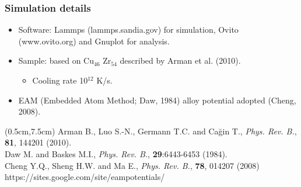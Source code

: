 \documentclass[12pt,t]{beamer}
\begin{document}

\begin{frame}
    \frametitle{Simulation details}
    \vspace{0.2cm}
    \begin{itemize}
        \item Software: Lammps (lammps.sandia.gov) for simulation, Ovito (www.ovito.org) and Gnuplot for analysis.
        \item Sample: based on Cu$_{46}$ Zr$_{54}$ described by Arman et al. (2010).
        \begin{itemize}
            \item Cooling rate 10$^{12}$ K/s.
        \end{itemize}
        \item EAM (Embedded Atom Method; Daw, 1984) alloy potential adopted (Cheng, 2008).
    \end{itemize}
    \begin{textblock*}{12cm}(0.5cm,7.5cm) %
        \scriptsize{Arman B., Luo S.-N., Germann T.C. and Cağin T., \textit{Phys. Rev. B.}, \textbf{81}, 144201 (2010).\\
        Daw M. and Baskes M.I., \textit{Phys. Rev. B.}, \textbf{29}:6443-6453 (1984).\\
        Cheng Y.Q., Sheng H.W. and Ma E., \textit{Phys. Rev. B.}, \textbf{78}, 014207 (2008) https://sites.google.com/site/eampotentials/}
    \end{textblock*}
\end{frame}

\end{document}
